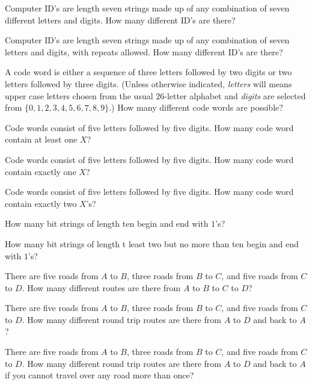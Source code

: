 \begin{prob}
Computer ID's are length seven strings made up of any combination of seven different letters and digits. How many different ID's are there? 
\end{prob}

\begin{prob}
Computer ID's are length seven strings made up of any combination of seven letters and digits, with repeats allowed. How many different ID's are there? 
\end{prob}

\begin{prob}A code word is either a sequence of three letters followed
by two digits or two letters followed by three digits. (Unless otherwise
indicated, {\itshape letters} will means
 upper case letters chosen from the usual
$26$-letter alphabet and {\itshape digits} are selected from 
$\{0,1,2,3,4,5,6,7,8,9\}$.) How many different code words are possible?
\end{prob}

\begin{prob}
Code words consist of five letters followed by five digits. How many code word contain at least one $X$?
\end{prob}

\begin{prob}
Code words consist of five letters followed by five digits. How many code word contain exactly one $X$?
\end{prob}


\begin{prob}
Code words consist of five letters followed by five digits. How many code word contain exactly two $X$'s?
\end{prob}


\begin{prob}
How many bit strings of length ten begin and end with $1$'s?
\end{prob}

\begin{prob}
How many bit strings of length t least two but no more than ten begin and end with $1$'s?
\end{prob}

\begin{prob}
There are five roads from $A$ to $B$, three roads from $B$ to $C$, and five roads from $C$ to $D$. How many different routes are there 
from $A$ to $B$ to $C$ to $D$?
\end{prob}

\begin{prob}
There are five roads from $A$ to $B$, three roads from $B$ to $C$, and five roads from $C$ to $D$. How many different round trip routes are there 
from $A$ to $D$ and back to $A$?
\end{prob}

\begin{prob}
 There are five roads from $A$ to $B$, three roads from $B$ to $C$, and five roads from $C$ to $D$. How many different round trip routes are there 
from $A$ to $D$ and back to $A$ if you cannot travel over any road more than once?
\end{prob}
